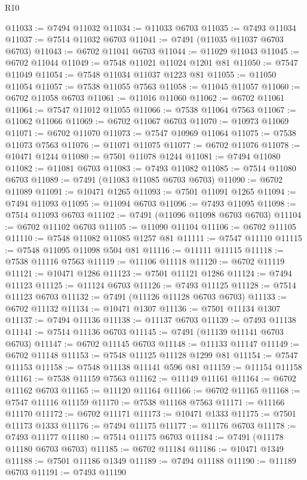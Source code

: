 \begin{lexlean}{R10}
\begin{coremodule}
@11033 := @7494 @11032
@11034 := @11033 @6703
@11035 := @7493 @11034
@11037 := @7514 @11032 @6703
@11041 := @7491 (@11035 @11037 @6703 @6703)
@11043 := @6702 @11041 @6703
@11044 := @11029 @11043
@11045 := @6702 @11044
@11049 := @7548 @11021 @11024 @1201 @81
@11050 := @7547 @11049
@11054 := @7548 @11034 @11037 @1223 @81
@11055 := @11050 @11054
@11057 := @7538 @11055 @7563
@11058 := @11045 @11057
@11060 := @6702 @11058 @6703
@11061 := @11016 @11060
@11062 := @6702 @11061
@11064 := @7547 @11012 @11055
@11066 := @7538 @11064 @7563
@11067 := @11062 @11066
@11069 := @6702 @11067 @6703
@11070 := @10973 @11069
@11071 := @6702 @11070
@11073 := @7547 @10969 @11064
@11075 := @7538 @11073 @7563
@11076 := @11071 @11075
@11077 := @6702 @11076
@11078 := @10471 @1244
@11080 := @7501 @11078 @1244
@11081 := @7494 @11080
@11082 := @11081 @6703
@11083 := @7493 @11082
@11085 := @7514 @11080 @6703
@11089 := @7491 (@11083 @11085 @6703 @6703)
@11090 := @6702 @11089
@11091 := @10471 @1265
@11093 := @7501 @11091 @1265
@11094 := @7494 @11093
@11095 := @11094 @6703
@11096 := @7493 @11095
@11098 := @7514 @11093 @6703
@11102 := @7491 (@11096 @11098 @6703 @6703)
@11104 := @6702 @11102 @6703
@11105 := @11090 @11104
@11106 := @6702 @11105
@11110 := @7548 @11082 @11085 @1257 @81
@11111 := @7547 @11110
@11115 := @7548 @11095 @11098 @504 @81
@11116 := @11111 @11115
@11118 := @7538 @11116 @7563
@11119 := @11106 @11118
@11120 := @6702 @11119
@11121 := @10471 @1286
@11123 := @7501 @11121 @1286
@11124 := @7494 @11123
@11125 := @11124 @6703
@11126 := @7493 @11125
@11128 := @7514 @11123 @6703
@11132 := @7491 (@11126 @11128 @6703 @6703)
@11133 := @6702 @11132
@11134 := @10471 @1307
@11136 := @7501 @11134 @1307
@11137 := @7494 @11136
@11138 := @11137 @6703
@11139 := @7493 @11138
@11141 := @7514 @11136 @6703
@11145 := @7491 (@11139 @11141 @6703 @6703)
@11147 := @6702 @11145 @6703
@11148 := @11133 @11147
@11149 := @6702 @11148
@11153 := @7548 @11125 @11128 @1299 @81
@11154 := @7547 @11153
@11158 := @7548 @11138 @11141 @596 @81
@11159 := @11154 @11158
@11161 := @7538 @11159 @7563
@11162 := @11149 @11161
@11164 := @6702 @11162 @6703
@11165 := @11120 @11164
@11166 := @6702 @11165
@11168 := @7547 @11116 @11159
@11170 := @7538 @11168 @7563
@11171 := @11166 @11170
@11172 := @6702 @11171
@11173 := @10471 @1333
@11175 := @7501 @11173 @1333
@11176 := @7494 @11175
@11177 := @11176 @6703
@11178 := @7493 @11177
@11180 := @7514 @11175 @6703
@11184 := @7491 (@11178 @11180 @6703 @6703)
@11185 := @6702 @11184
@11186 := @10471 @1349
@11188 := @7501 @11186 @1349
@11189 := @7494 @11188
@11190 := @11189 @6703
@11191 := @7493 @11190

\end{coremodule}
\end{lexlean}
